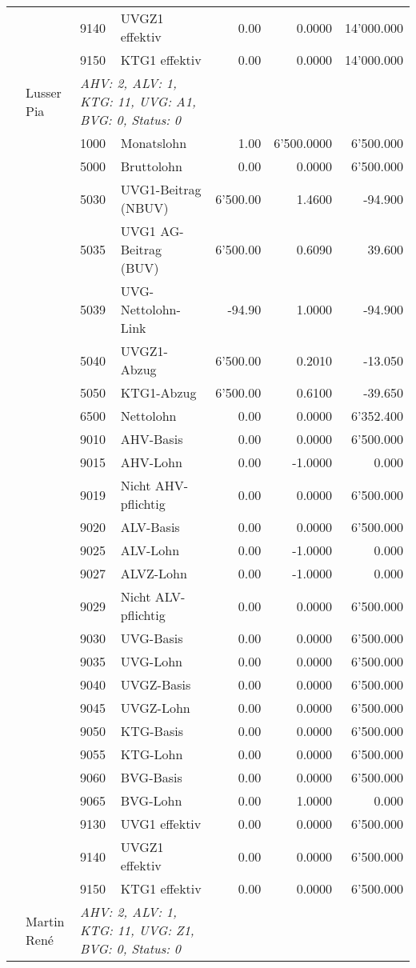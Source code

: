 \documentclass[15pt,a4paper]{article}
\begin{document}
\begin{longtable}{@{\extracolsep{\fill}}l l l l|r|r|r}
&&9140&UVGZ1 effektiv&0.00&0.0000&14'000.000\\
&&9150&KTG1 effektiv&0.00&0.0000&14'000.000\\
\pagebreak
15&Lusser Pia&\multicolumn{2}{l|}{\small\emph{AHV: 2, ALV: 1, KTG: 11, UVG: A1, BVG: 0, Status: 0}}&& \\
&&1000&Monatslohn&1.00&6'500.0000&6'500.000\\
&&5000&Bruttolohn&0.00&0.0000&6'500.000\\
&&5030&UVG1-Beitrag (NBUV)&6'500.00&1.4600&-94.900\\
&&5035&UVG1 AG-Beitrag (BUV)&6'500.00&0.6090&39.600\\
&&5039&UVG-Nettolohn-Link&-94.90&1.0000&-94.900\\
&&5040&UVGZ1-Abzug&6'500.00&0.2010&-13.050\\
&&5050&KTG1-Abzug&6'500.00&0.6100&-39.650\\
&&6500&Nettolohn&0.00&0.0000&6'352.400\\
&&9010&AHV-Basis&0.00&0.0000&6'500.000\\
&&9015&AHV-Lohn&0.00&-1.0000&0.000\\
&&9019&Nicht AHV-pflichtig&0.00&0.0000&6'500.000\\
&&9020&ALV-Basis&0.00&0.0000&6'500.000\\
&&9025&ALV-Lohn&0.00&-1.0000&0.000\\
&&9027&ALVZ-Lohn&0.00&-1.0000&0.000\\
&&9029&Nicht ALV-pflichtig&0.00&0.0000&6'500.000\\
&&9030&UVG-Basis&0.00&0.0000&6'500.000\\
&&9035&UVG-Lohn&0.00&0.0000&6'500.000\\
&&9040&UVGZ-Basis&0.00&0.0000&6'500.000\\
&&9045&UVGZ-Lohn&0.00&0.0000&6'500.000\\
&&9050&KTG-Basis&0.00&0.0000&6'500.000\\
&&9055&KTG-Lohn&0.00&0.0000&6'500.000\\
&&9060&BVG-Basis&0.00&0.0000&6'500.000\\
&&9065&BVG-Lohn&0.00&1.0000&0.000\\
&&9130&UVG1 effektiv&0.00&0.0000&6'500.000\\
&&9140&UVGZ1 effektiv&0.00&0.0000&6'500.000\\
&&9150&KTG1 effektiv&0.00&0.0000&6'500.000\\
\pagebreak
16&Martin René&\multicolumn{2}{l|}{\small\emph{AHV: 2, ALV: 1, KTG: 11, UVG: Z1, BVG: 0, Status: 0}}&& \\

\end{longtable}
\end{document}
